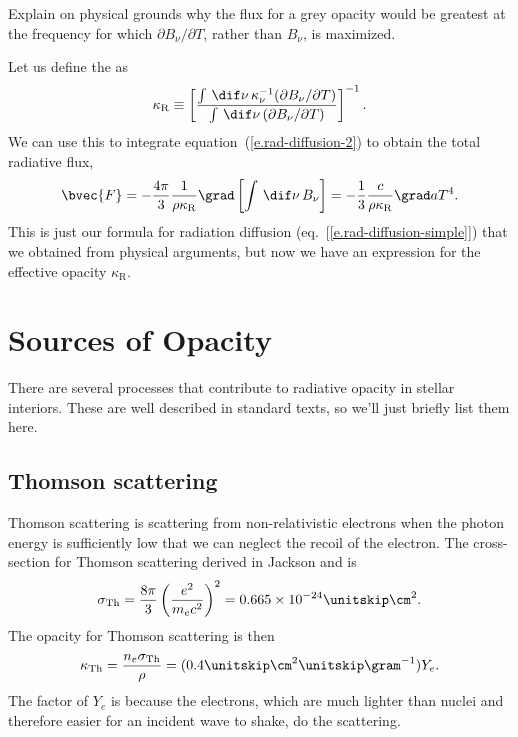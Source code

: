 \begin{exercisebox}
Explain on physical grounds why the flux for a grey opacity would be greatest at the frequency for which $\partial B_{\nu}/\partial T$, rather than $B_{\nu}$, is maximized.
\end{exercisebox}

Let us define the  as
\[ \kappa_{\mathrm{R}} \equiv \left[\frac{\int\,\dif\nu\,\kappa_{\nu}^{-1}(\partial B_{\nu}/\partial T)}{\int \,\dif\nu\, (\partial B_{\nu}/\partial T)}\right]^{-1}. \]
We can use this to integrate equation~(\ref{e.rad-diffusion-2}) to obtain the total radiative flux,
\begin{equation}\label{e.rad-flux}
\bvec{F} = - \frac{4\pi}{3} \frac{1}{\rho\kappa_{\mathrm{R}}} \grad\left[\int\,\dif\nu\,B_{\nu}\right] = - \frac{1}{3} \frac{c}{\rho\kappa_{\mathrm{R}}} \grad aT^{4}.
\end{equation}
This is just our formula for radiation diffusion (eq.~[\ref{e.rad-diffusion-simple}]) that we obtained from physical arguments, but now we have an expression for the effective opacity $\kappa_{\mathrm{R}}$.

\section{Sources of Opacity}\label{s.opacity-sources}

There are several processes that contribute to radiative opacity in stellar interiors.  These are well described in standard texts, so we'll just briefly list them here.

\subsection{Thomson scattering}
Thomson scattering is scattering from non-relativistic electrons when the photon energy is sufficiently low that we can neglect the recoil of the electron.  The cross-section for Thomson scattering derived in Jackson and is 
\begin{equation}\label{e.Thomson-cross-section}
\sigma_{\mathrm{Th}} = \frac{8\pi}{3}\left(\frac{e^{2}}{m_{e}c^{2}}\right)^{2} = 0.665 \times 10^{-24} \nsp\cm^{2}.
\end{equation}
The opacity for Thomson scattering is then
\[ \kappa_{\mathrm{Th}} = \frac{n_{e}\sigma_{\mathrm{Th}}}{\rho} = (0.4\nsp\cm^{2}\nsp\gram^{-1}) Y_{e}. \]
The factor of $Y_{e}$ is because the electrons, which are much lighter than nuclei and therefore easier for an incident wave to shake, do the scattering.

